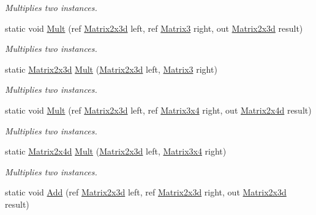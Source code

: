 \begin{DoxyCompactItemize}
\begin{DoxyCompactList}\small\item\em Multiplies two instances. \end{DoxyCompactList}\item 
static void \hyperlink{struct_open_t_k_1_1_matrix2x3d_ae5c4c59ca6fe642e0bd7149d0cf0d18f}{Mult} (ref \hyperlink{struct_open_t_k_1_1_matrix2x3d}{Matrix2x3d} left, ref \hyperlink{struct_open_t_k_1_1_matrix3}{Matrix3} right, out \hyperlink{struct_open_t_k_1_1_matrix2x3d}{Matrix2x3d} result)
\begin{DoxyCompactList}\small\item\em Multiplies two instances. \end{DoxyCompactList}\item 
static \hyperlink{struct_open_t_k_1_1_matrix2x3d}{Matrix2x3d} \hyperlink{struct_open_t_k_1_1_matrix2x3d_abbb74a6cd01998a9fcd7077c7da8c597}{Mult} (\hyperlink{struct_open_t_k_1_1_matrix2x3d}{Matrix2x3d} left, \hyperlink{struct_open_t_k_1_1_matrix3}{Matrix3} right)
\begin{DoxyCompactList}\small\item\em Multiplies two instances. \end{DoxyCompactList}\item 
static void \hyperlink{struct_open_t_k_1_1_matrix2x3d_afb61a6dc794af891bcd642fbd0a3ff59}{Mult} (ref \hyperlink{struct_open_t_k_1_1_matrix2x3d}{Matrix2x3d} left, ref \hyperlink{struct_open_t_k_1_1_matrix3x4}{Matrix3x4} right, out \hyperlink{struct_open_t_k_1_1_matrix2x4d}{Matrix2x4d} result)
\begin{DoxyCompactList}\small\item\em Multiplies two instances. \end{DoxyCompactList}\item 
static \hyperlink{struct_open_t_k_1_1_matrix2x4d}{Matrix2x4d} \hyperlink{struct_open_t_k_1_1_matrix2x3d_a140ed8ecd6ccd2a494e1d81f289120e5}{Mult} (\hyperlink{struct_open_t_k_1_1_matrix2x3d}{Matrix2x3d} left, \hyperlink{struct_open_t_k_1_1_matrix3x4}{Matrix3x4} right)
\begin{DoxyCompactList}\small\item\em Multiplies two instances. \end{DoxyCompactList}\item 
static void \hyperlink{struct_open_t_k_1_1_matrix2x3d_a3c39ce5e7e40cee1e7f1483d938028fe}{Add} (ref \hyperlink{struct_open_t_k_1_1_matrix2x3d}{Matrix2x3d} left, ref \hyperlink{struct_open_t_k_1_1_matrix2x3d}{Matrix2x3d} right, out \hyperlink{struct_open_t_k_1_1_matrix2x3d}{Matrix2x3d} result)

\end{DoxyCompactItemize}

